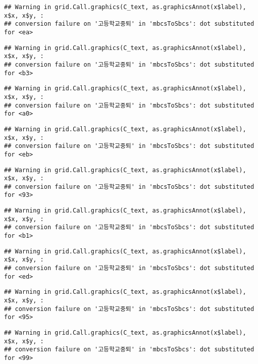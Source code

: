 \documentclass[
]{article}
\begin{document}
\begin{verbatim}
## Warning in grid.Call.graphics(C_text, as.graphicsAnnot(x$label), x$x, x$y, :
## conversion failure on '고등학교중퇴' in 'mbcsToSbcs': dot substituted for <ea>
\end{verbatim}

\begin{verbatim}
## Warning in grid.Call.graphics(C_text, as.graphicsAnnot(x$label), x$x, x$y, :
## conversion failure on '고등학교중퇴' in 'mbcsToSbcs': dot substituted for <b3>
\end{verbatim}

\begin{verbatim}
## Warning in grid.Call.graphics(C_text, as.graphicsAnnot(x$label), x$x, x$y, :
## conversion failure on '고등학교중퇴' in 'mbcsToSbcs': dot substituted for <a0>
\end{verbatim}

\begin{verbatim}
## Warning in grid.Call.graphics(C_text, as.graphicsAnnot(x$label), x$x, x$y, :
## conversion failure on '고등학교중퇴' in 'mbcsToSbcs': dot substituted for <eb>
\end{verbatim}

\begin{verbatim}
## Warning in grid.Call.graphics(C_text, as.graphicsAnnot(x$label), x$x, x$y, :
## conversion failure on '고등학교중퇴' in 'mbcsToSbcs': dot substituted for <93>
\end{verbatim}

\begin{verbatim}
## Warning in grid.Call.graphics(C_text, as.graphicsAnnot(x$label), x$x, x$y, :
## conversion failure on '고등학교중퇴' in 'mbcsToSbcs': dot substituted for <b1>
\end{verbatim}

\begin{verbatim}
## Warning in grid.Call.graphics(C_text, as.graphicsAnnot(x$label), x$x, x$y, :
## conversion failure on '고등학교중퇴' in 'mbcsToSbcs': dot substituted for <ed>
\end{verbatim}

\begin{verbatim}
## Warning in grid.Call.graphics(C_text, as.graphicsAnnot(x$label), x$x, x$y, :
## conversion failure on '고등학교중퇴' in 'mbcsToSbcs': dot substituted for <95>
\end{verbatim}

\begin{verbatim}
## Warning in grid.Call.graphics(C_text, as.graphicsAnnot(x$label), x$x, x$y, :
## conversion failure on '고등학교중퇴' in 'mbcsToSbcs': dot substituted for <99>
\end{verbatim}
\end{document}
